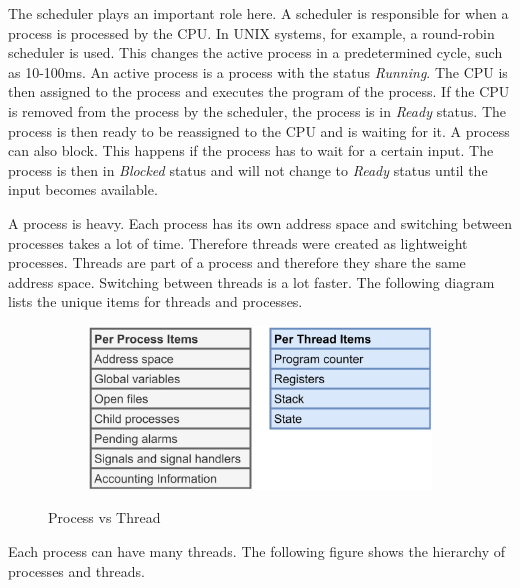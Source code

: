 The scheduler plays an important role here. A scheduler is responsible for when a process is processed by the CPU. In UNIX systems, for example, a round-robin scheduler is used. This changes the active process in a predetermined cycle, such as 10-100ms. \cite{Schoettner:bs18:6.6.4}
An active process is a process with the status \textit{Running}. The CPU is then assigned to the process and executes the program of the process. If the CPU is removed from the process by the scheduler, the process is in \textit{Ready} status. The process is then ready to be reassigned to the CPU and is waiting for it. A process can also block. This happens if the process has to wait for a certain input. The process is then in \textit{Blocked} status and will not change to \textit{Ready} status until the input becomes available. \cite{Tannenbaum:93}

A process is heavy. Each process has its own address space and switching between processes takes a lot of time. Therefore threads were created as lightweight processes. Threads are part of a process and therefore they share the same address space. Switching between threads is a lot faster. The following diagram lists the unique items for threads and processes.
\\
\begin{figure}[H]
  \centering
  \begin{subfigure}[b]{0.6\textwidth}
    \includegraphics[width=1.0\linewidth]{img/process-thread-items.png}
  \end{subfigure}
  \caption{Process vs Thread \cite{Tannenbaum:104}}
  \label{Process vs Thread}
\end{figure}

Each process can have many threads. The following figure shows the hierarchy of processes and threads.

